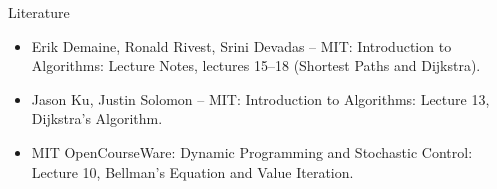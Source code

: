 \documentclass{beamer}
\begin{document}
\begin{frame}{Literature}
	\begin{itemize}
		
		\item Erik Demaine, Ronald Rivest, Srini Devadas -- MIT:
		{Introduction to Algorithms: Lecture Notes, lectures 15--18 (Shortest Paths and Dijkstra).}
		
		\item Jason Ku, Justin Solomon -- MIT:
		{Introduction to Algorithms: Lecture 13, Dijkstra's Algorithm.}
		
		\item MIT OpenCourseWare:
		{Dynamic Programming and Stochastic Control: Lecture 10, Bellman's Equation and Value Iteration.}
		
	\end{itemize}
\end{frame}




\myqrframe
\end{document}
